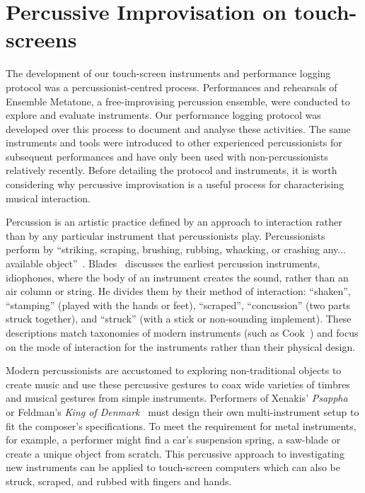 \documentclass[graybox]{svmult}
\begin{document}
\section{Percussive Improvisation on touch-screens}
\label{sec:percussive-interaction}

The development of our touch-screen instruments and performance
logging protocol was a percussionist-centred process. Performances and
rehearsals of Ensemble Metatone, a free-improvising percussion
ensemble, were conducted to explore and evaluate instruments. Our
performance logging protocol was developed over this process to
document and analyse these activities. The same instruments and tools
were introduced to other experienced percussionists for subsequent
performances and have only been used with non-percussionists
relatively recently. Before detailing the protocol and instruments, it
is worth considering why percussive improvisation is a useful process
for characterising musical interaction.

Percussion is an artistic practice defined by an approach to
interaction rather than by any particular instrument that
percussionists play. Percussionists perform by ``striking, scraping,
brushing, rubbing, whacking, or crashing any... available
object''~\cite{Schick:2006fk}. Blades~\cite{Blades:1992kx} discusses
the earliest percussion instruments, idiophones, where the body of an
instrument creates the sound, rather than an air column or string. He
divides them by their method of interaction: ``shaken'', ``stamping''
(played with the hands or feet), ``scraped'', ``concussion'' (two
parts struck together), and ``struck'' (with a stick or non-sounding
implement). These descriptions match taxonomies of modern instruments
(such as Cook~\cite{Cook:1997vn}) and focus on the mode of interaction
for the instruments rather than their physical design.

Modern percussionists are accustomed to exploring non-traditional
objects to create music and use these percussive gestures to coax wide
varieties of timbres and musical gestures from simple instruments.
Performers of Xenakis' \emph{Psappha}~\cite{Xenakis:1975uq} or
Feldman's \emph{King of Denmark}~\cite{Feldman:1965uq} must design
their own multi-instrument setup to fit the composer's specifications.
To meet the requirement for metal instruments, for example, a
performer might find a car's suspension spring, a saw-blade or create
a unique object from scratch. This percussive approach to
investigating new instruments can be applied to touch-screen computers
which can also be struck, scraped, and rubbed with fingers and hands.
\end{document}
